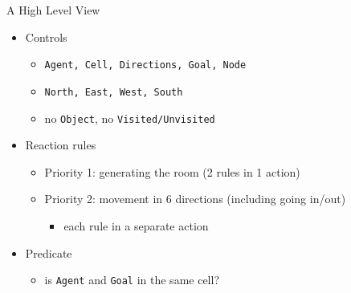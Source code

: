 \documentclass{beamer}
\begin{document}
\begin{frame}{A High Level View}
  \begin{itemize}
  \item Controls
    \begin{itemize}
    \item \texttt{Agent, Cell, Directions, \alert{Goal}, \alert{Node}}
      \pause
    \item \texttt{North, East, West, South}
    \item no \texttt{Object}, no \texttt{Visited/Unvisited}
    \end{itemize}
    \pause
  \item Reaction rules
    \begin{itemize}
    \item Priority 1: generating the room (2 rules in 1 action)
      \pause
    \item Priority 2: movement in 6 directions (including going in/out)
      \begin{itemize}
      \item each rule in a separate action
      \end{itemize}
    \end{itemize}
    \pause
  \item Predicate
    \begin{itemize}
    \item is \texttt{Agent} and \texttt{Goal} in the same cell?
    \end{itemize}
  \end{itemize}
\end{frame}
\end{document}

